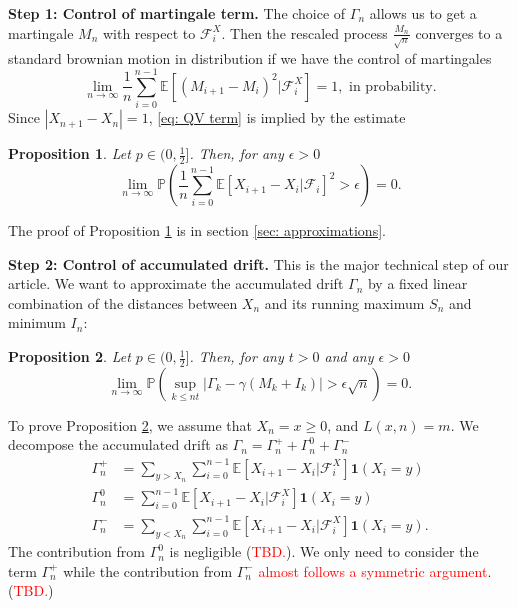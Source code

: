 \documentclass[twoside,12pt,a4paper]{article}
\newtheorem{proposition}{Proposition}[section]
\numberwithin{equation}{section}
\newcommand{\abs}[1]{\left\vert #1 \right\vert}
\newcommand\TBD{\textcolor{red}{TBD.}}
\begin{document}
\textbf{Step 1: Control of martingale term.}
The choice of $\Gamma_n$ allows us to get a martingale $M_n$ with respect to $\mathcal{F}_i^X.$ Then the rescaled process $\frac{M_n}{\sqrt{n}}$ converges to a standard brownian motion in distribution if we have the control of martingales 
\begin{equation}\label{eq: QV term}
\lim_{n\to \infty}\frac{1}{n} \sum_{i=0}^{n-1}\mathbb{E}\left[ (M_{i+1}- M_{i})^2 |\mathcal{F}_i^X \right] =1,  \mbox{ in probability}.
\end{equation}
Since $\abs{X_{n+1}-X_n}=1$,  \eqref{eq: QV term} is implied by the estimate
\begin{proposition} \label{lm: control of martingale} Let $p\in (0,\frac{1}{2}]$. Then, for any $\epsilon >0$
	\begin{equation}\label{eq:  term}
	\lim_{n \to \infty }\mathbb{P}\left(\frac{1}{n} \sum_{i = 0}^{n-1} \mathbb{E}\left[ X_{i+1} - X_i | \mathcal{F}_i \right]^2 > \epsilon \right) =0. 
\end{equation}
\end{proposition}
The proof of Proposition \ref{lm: control of martingale} is in section \ref{sec: approximations}.

\textbf{Step 2: Control of accumulated drift.} This is the major technical step of our article. We want to approximate the accumulated drift $\Gamma_n$ by a fixed linear combination of the distances between $X_n$ and its running maximum $S_n$ and minimum $I_n$:
\begin{proposition}\label{lm: control of acc drift}
	 Let $p\in (0,\frac{1}{2}]$. Then, for any $t>0$ and any $\epsilon >0$
	\begin{equation}\label{eq: control of acc drift}
		\lim_{n \to \infty }\mathbb{P}\left(\sup_{k\leq nt} \abs{\Gamma_k - \gamma \left(M_k + I_k \right)   } > \epsilon \sqrt{n}  \right) =0. 
	\end{equation}
\end{proposition}
To prove Proposition \ref{lm: control of acc drift}, we assume that $X_n=x \geq 0$, and $L(x,n)=m$. We decompose the accumulated drift as $\Gamma_n = 	\Gamma_n^+ +	\Gamma_n^0 + \Gamma_n^-$ 
\begin{align}
	\Gamma_n^+ &= \sum_{y > X_n} \sum_{i = 0}^{n-1} \mathbb{E}\left[ X_{i + 1} - X_i | \mathcal{F}_i^X \right] \mathbf{1}(X_i = y)\\
	\Gamma_n^0 &= \sum_{i = 0}^{n-1} \mathbb{E}\left[ X_{i + 1} - X_i | \mathcal{F}_i^X \right] \mathbf{1}(X_i = y) \\
	\Gamma_n^- &= \sum_{y < X_n} \sum_{i = 0}^{n-1} \mathbb{E}\left[ X_{i + 1} - X_i | \mathcal{F}_i^X \right] \mathbf{1}(X_i = y)
.\end{align} 
The contribution from $\Gamma_n^0$ is negligible (\TBD). We only need to consider the term $\Gamma_n^+$ while the contribution from $\Gamma_n^-$ \textcolor{red}{almost follows a symmetric argument}. (\TBD) 
\end{document}

